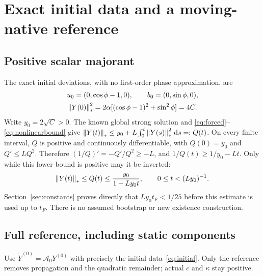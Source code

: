 \section{Exact initial data and a moving-native reference}\label{sec:reference}
\subsection{Positive scalar majorant}\label{sec:majorant}
The exact initial deviations, with no first-order phase approximation, are
\begin{equation}\label{eq:initial}%
\begin{gathered}
 u_0=(0,\cos\phi-1,0),\qquad b_0=(0,\sin\phi,0),\\
 \norm{Y(0)}_*^2
 =2\alpha[(\cos\phi-1)^2+\sin^2\phi]=4C .
\end{gathered}
\end{equation}
Write $y_0=2\sqrt C>0$. The known global strong solution and
\eqref{eq:forced}--\eqref{eq:nonlinearbound} give
$\left\|Y(t)\right\|_*\le y_0+L\int_0^t\left\|Y(s)\right\|_*^2\,\mathrm d s=:Q(t)$.
On every finite interval, $Q$ is positive and continuously differentiable, with
$Q(0)=y_0$ and $Q'\le LQ^2$. Therefore
$(1/Q)'=-Q'/Q^2\ge-L$, and $1/Q(t)\ge1/y_0-Lt$.
Only while this lower bound is positive may it be inverted:
\begin{equation}\label{eq:majorant}%
 \norm{Y(t)}_*\le Q(t)\le\frac{y_0}{1-Ly_0t},
 \qquad 0\le t<(Ly_0)^{-1}.
\end{equation}
Section~\ref{sec:constants} proves directly that $Ly_0t_F<1/25$ before this estimate is used up to $t_F$. There is no assumed bootstrap or new existence construction.

\subsection{Full reference, including static components}\label{sec:embedding}
Use $\dot Y^{(0)}=\mathcal A_0Y^{(0)}$ with precisely the initial data~\eqref{eq:initial}. Only the reference removes propagation and the quadratic remainder; actual $c$ and $\kappa$ stay positive.

